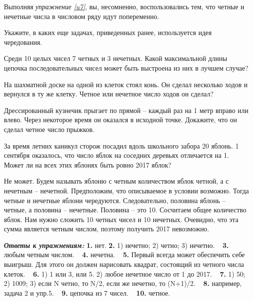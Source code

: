 Выполняя \textit{упражнение \ref{u7}}, вы, несомненно, воспользовались тем, что четные и нечетные числа в числовом ряду идут попеременно.  

\begin{ex}
	Укажите, в каких еще задачах, приведенных ранее, используется идея чередования. 
\end{ex}

\begin{ex}
	Среди 10 целых чисел 7 четных и 3 нечетных. Какой максимальной длины цепочка последовательных чисел может быть выстроена из них в лучшем случае?
\end{ex}

\begin{ex}
	На шахматной доске на одной из клеток стоял конь. Он сделал несколько ходов и вернулся в ту же клетку. Четное или нечетное число ходов он сделал?
\end{ex}

\begin{ex}
	Дрессированный кузнечик прыгает по прямой – каждый раз на 1 метр вправо или влево. Через некоторое время он оказался в исходной точке. Докажите, что он сделал четное число прыжков.
\end{ex}

\begin{thm}
	За время летних каникул сторож посадил вдоль школьного забора 20 яблонь. 1 сентября оказалось, что число яблок на соседних деревьях отличается на 1. Может ли на всех этих яблонях быть ровно 2017 яблок?
\end{thm}

\begin{prf}
	Не может. Будем называть яблоню с четным количеством яблок четной, а с нечетным – нечетной. Предположим, что описываемое в условии возможно. Тогда четные и нечетные яблони чередуются. Следовательно, половина яблонь – четные, а половина – нечетные. Половина – это 10. Сосчитаем общее количество яблок. Нам нужно сложить 10 четных чисел и 10 нечетных. Очевидно, что эта сумма является четным числом, поэтому получить 2017 невозможно.    
\end{prf}

\textbf{\textit{Ответы к упражнениям:}}
\textbf{1.} нет. 
\textbf{2.} 1) нечетно; 2) четно; 3) нечетно. ~
\textbf{3.} любым четным числом. ~
\textbf{4.} нечетна. ~
\textbf{5.} Первый всегда может обеспечить себе выигрыш. Для этого он должен нарисовать квадрат, состоящий из четного числа клеток. ~
\textbf{6.} 1) 1 или 3, или 5. 2) любое нечетное число от 1 до 2017. ~
\textbf{7.} 1) 50; 2) 1009; 3) если N четно, то N/2, если же нечетно, то (N+1)/2. ~
\textbf{8.} например, задача 2 и упр.5. ~
\textbf{9.} цепочка из 7 чисел. ~
\textbf{10.} четное. ~
